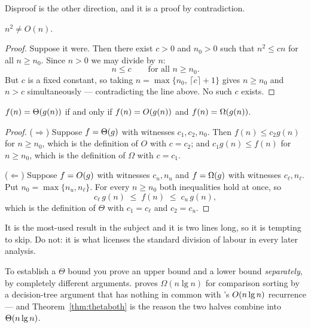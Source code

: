 Disproof is the other direction, and it is a proof by contradiction.

\begin{theorem}\label{thm:notlin}
$n^{2} \ne O(n)$.
\end{theorem}

\begin{proof}
Suppose it were. Then there exist $c > 0$ and $n_{0} > 0$ such that
$n^{2} \le cn$ for all $n \ge n_{0}$. Since $n > 0$ we may divide by $n$:
\[ n \le c \qquad \text{for all } n \ge n_{0}. \]
But $c$ is a fixed constant, so taking $n = \max\{n_{0},\, \lceil c \rceil +
1\}$ gives $n \ge n_{0}$ and $n > c$ simultaneously --- contradicting the line
above. No such $c$ exists.
\end{proof}

\begin{theorem}\label{thm:thetaboth}
$f(n) = \Theta(g(n))$ if and only if $f(n) = O(g(n))$ and
$f(n) = \Omega(g(n))$.
\end{theorem}

\begin{proof}
($\Rightarrow$) Suppose $f = \Theta(g)$ with witnesses $c_{1}, c_{2}, n_{0}$.
Then $f(n) \le c_{2}g(n)$ for $n \ge n_{0}$, which is the definition of
$O$ with $c = c_{2}$; and $c_{1}g(n) \le f(n)$ for $n \ge n_{0}$, which is the
definition of $\Omega$ with $c = c_{1}$.

\smallskip
($\Leftarrow$) Suppose $f = O(g)$ with witnesses $c_{u}, n_{u}$ and
$f = \Omega(g)$ with witnesses $c_{\ell}, n_{\ell}$. Put $n_{0} =
\max\{n_{u}, n_{\ell}\}$. For every $n \ge n_{0}$ both inequalities hold at
once, so
\[ c_{\ell}\,g(n) \;\le\; f(n) \;\le\; c_{u}\,g(n), \]
which is the definition of $\Theta$ with $c_{1} = c_{\ell}$ and
$c_{2} = c_{u}$.
\end{proof}

\begin{conceptbox}
It is the most-used result in the subject and it is two lines long, so it is
tempting to skip. Do not: it is what licenses the standard division of labour
in every later analysis.

\smallskip
To establish a $\Theta$ bound you prove an upper bound and a lower bound
\emph{separately}, by completely different arguments.  proves
$\Omega(n\lg n)$ for comparison sorting by a decision-tree argument that has
nothing in common with 's $O(n \operatorname{lg} n)$ recurrence --- and
Theorem~\ref{thm:thetaboth} is the reason the two halves combine into
$\Theta(n\operatorname{lg} n)$.
\end{conceptbox}

